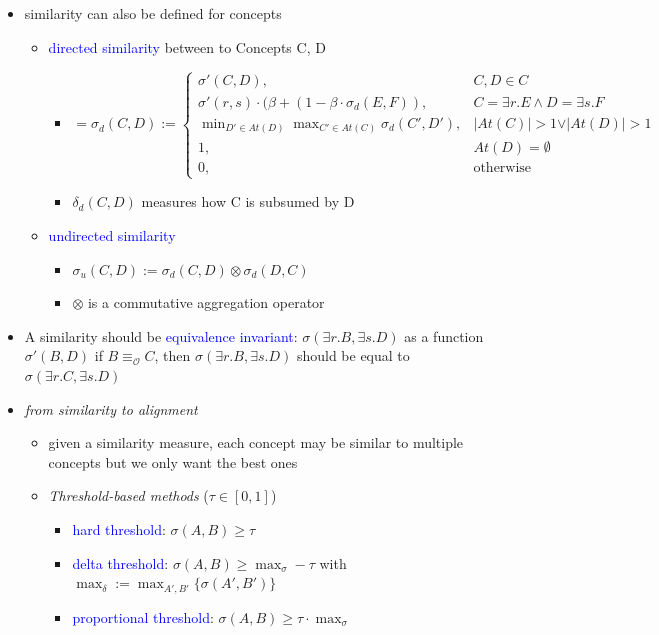\documentclass[12pt,a4paper]{article}
\newcommand{\blue}[1]{\textcolor{blue} {#1}}
\newcommand{\ont}{\mathcal{O}}
\begin{document}
\begin{itemize}
\item similarity can also be defined for concepts\\
\begin{itemize}
\item \blue{directed similarity} between to Concepts C, D
\begin{itemize}
\item $\displaystyle = \sigma_d(C,D) := \begin{cases} \sigma'(C,D), & C,D \in C\\\sigma'(r,s)\cdot (\beta +(1-\beta\cdot\sigma_d(E,F)), & C=\exists r.E \land D= \exists s.F\\ \displaystyle\min_{D'\in At(D)} \max_{C'\in At(C)} \sigma_d(C',D'),& \vert At(C) \vert > 1 \lor \vert At(D) \vert > 1\\ 1, & At(D)=\emptyset\\ 0, & \text{otherwise}\end{cases}$
\item $\delta_d(C,D)$ measures how C is subsumed by D
\end{itemize}
\item \blue{undirected similarity}
\begin{itemize}
\item $\sigma_u(C,D) := \sigma_d(C,D) \otimes \sigma_d(D,C)$
\item $\otimes$ is a commutative aggregation operator
\end{itemize}
\end{itemize}
\item A similarity should be \blue{equivalence invariant}: $\sigma(\exists r.B, \exists s.D)$ as a function $\sigma'(B,D)$ if $B \equiv_\ont C$, then $\sigma(\exists r.B, \exists s.D)$ should be equal to $\sigma(\exists r.C, \exists s.D)$
\item \textit{from similarity to alignment}
\begin{itemize}
\item given a similarity measure, each concept may be similar to multiple concepts but we only want the best ones
\item \textit{Threshold-based methods} ($\tau \in [0,1]$)
\begin{itemize}
\item \blue{hard threshold}: $\sigma(A,B) \geq \tau$
\item \blue{delta threshold}: $\displaystyle\sigma(A,B) \geq \max_\sigma - \tau$ with $\max_\delta := \max_{A',B'}\{\sigma(A',B')\}$
\item \blue{proportional threshold}: $\sigma(A,B) \geq \tau\cdot\max_\sigma$

\end{itemize}
\end{itemize}
\end{itemize}
\end{document}
